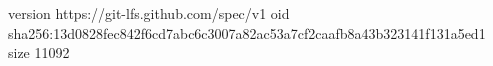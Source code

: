 version https://git-lfs.github.com/spec/v1
oid sha256:13d0828fec842f6cd7abc6c3007a82ac53a7cf2caafb8a43b323141f131a5ed1
size 11092
